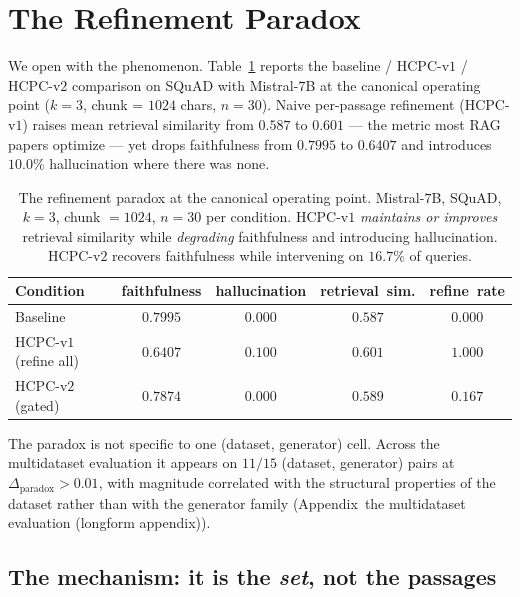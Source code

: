 \section{The Refinement Paradox}
\label{sec:paradox}



We open with the phenomenon. Table~\ref{tab:hcpc_main} reports the
baseline / HCPC-v$1$ / HCPC-v$2$ comparison on SQuAD with Mistral-$7$B
at the canonical operating point ($k{=}3$, chunk = $1024$ chars,
$n{=}30$). Naive per-passage refinement (HCPC-v$1$) raises mean
retrieval similarity from $0.587$ to $0.601$ --- the metric most RAG
papers optimize --- yet drops faithfulness from $0.7995$ to $0.6407$
and introduces $10.0\%$ hallucination where there was none.

\begin{table}[!htb]
\centering
\caption{The refinement paradox at the canonical operating point.
Mistral-$7$B, SQuAD, $k=3$, chunk $= 1024$, $n=30$ per condition.
HCPC-v$1$ \emph{maintains or improves} retrieval similarity while
\emph{degrading} faithfulness and introducing hallucination.
HCPC-v$2$ recovers faithfulness while intervening on $16.7\%$ of queries.}
\label{tab:hcpc_main}
\footnotesize
\begin{tabular}{lcccc}
\toprule
Condition & faithfulness & hallucination & retrieval~sim. & refine~rate \\
\midrule
Baseline       & $0.7995$ & $0.000$ & $0.587$ & $0.000$ \\
HCPC-v$1$ (refine all) & $0.6407$ & $\mathbf{0.100}$ & $0.601$ & $1.000$ \\
HCPC-v$2$ (gated)      & $\mathbf{0.7874}$ & $0.000$ & $0.589$ & $0.167$ \\
\bottomrule
\end{tabular}
\end{table}

The paradox is not specific to one (dataset, generator) cell. Across
the multidataset evaluation it appears on $11/15$ (dataset, generator)
pairs at $\Delta_{\textrm{paradox}} > 0.01$, with magnitude correlated
with the structural properties of the dataset rather than with the
generator family (Appendix~the multidataset evaluation (longform appendix)).

\subsection{The mechanism: it is the \emph{set}, not the passages}
\label{sec:paradox:mechanism}

